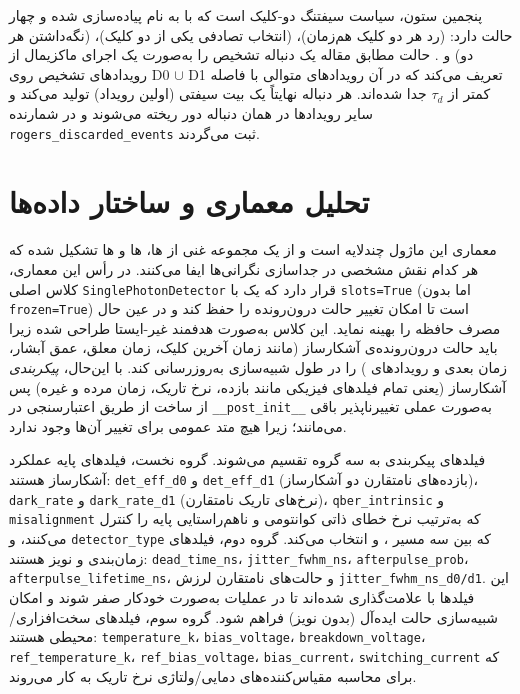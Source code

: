 پنجمین ستون، سیاست سيفتنگ دو-کلیک  است که با  به نام  پیاده‌سازی شده و چهار حالت دارد:  (رد هر دو کلیک هم‌زمان)،  (انتخاب تصادفی یکی از دو کلیک)،  (نگه‌داشتن هر دو) و . حالت  مطابق مقاله  یک دنباله تشخیص  را به‌صورت یک اجرای ماکزیمال از رویدادهای تشخیص روی D0 $\cup$ D1 تعریف می‌کند که در آن رویدادهای متوالی با فاصله کمتر از $\tau_d$ جدا شده‌اند. هر دنباله نهایتاً یک بیت سیفتی  (اولین رویداد) تولید می‌کند و سایر رویدادها در همان دنباله دور ریخته می‌شوند و در شمارنده \texttt{rogers\_discarded\_events} ثبت می‌گردند.

\section{تحلیل معماری و ساختار داده‌ها}

معماری این ماژول چندلایه است و از یک مجموعه غنی از ها، ها و ها تشکیل شده که هر کدام نقش مشخصی در جداسازی نگرانی‌ها  ایفا می‌کنند. در رأس این معماری، کلاس اصلی \texttt{SinglePhotonDetector} قرار دارد که یک  با \texttt{slots=True} (اما بدون \texttt{frozen=True}) است تا امکان تغییر حالت درون‌رونده  را حفظ کند و در عین حال مصرف حافظه را بهینه نماید. این کلاس به‌صورت هدفمند غیر-ایستا  طراحی شده زیرا باید حالت درون‌رونده‌ی آشکارساز (مانند زمان آخرین کلیک، زمان  معلق، عمق آبشار، زمان  بعدی و رویدادهای ) را در طول شبیه‌سازی به‌روزرسانی کند. با این‌حال، \textit{پیکربندی} آشکارساز (یعنی تمام فیلدهای فیزیکی مانند بازده، نرخ تاریک، زمان مرده و غیره) پس از ساخت از طریق اعتبارسنجی در \texttt{\_\_post\_init\_\_} به‌صورت عملی تغییرناپذیر باقی می‌مانند؛ زیرا هیچ متد عمومی برای تغییر آن‌ها وجود ندارد.

فیلدهای پیکربندی به سه گروه تقسیم می‌شوند. گروه نخست، فیلدهای پایه عملکرد آشکارساز هستند: \texttt{det\_eff\_d0} و \texttt{det\_eff\_d1} (بازده‌های نامتقارن دو آشکارساز)، \texttt{dark\_rate} و \texttt{dark\_rate\_d1} (نرخ‌های تاریک نامتقارن)، \texttt{qber\_intrinsic} و \texttt{misalignment} که به‌ترتیب نرخ خطای ذاتی کوانتومی و ناهم‌راستایی پایه را کنترل می‌کنند، و \texttt{detector\_type} که بین سه مسیر ،  و  انتخاب می‌کند. گروه دوم، فیلدهای زمان‌بندی و نویز هستند: \texttt{dead\_time\_ns}، \texttt{jitter\_fwhm\_ns}، \texttt{afterpulse\_prob}، \texttt{afterpulse\_lifetime\_ns}، و حالت‌های نامتقارن لرزش \texttt{jitter\_fwhm\_ns\_d0/d1}. این فیلدها با  علامت‌گذاری شده‌اند تا در عملیات  به‌صورت خودکار صفر شوند و امکان شبیه‌سازی حالت ایده‌آل (بدون نویز) فراهم شود. گروه سوم، فیلدهای سخت‌افزاری/محیطی هستند: \texttt{temperature\_k}، \texttt{bias\_voltage}، \texttt{breakdown\_voltage}، \texttt{ref\_temperature\_k}، \texttt{ref\_bias\_voltage}، \texttt{bias\_current}، \texttt{switching\_current} که برای محاسبه مقیاس‌کننده‌های دمایی/ولتاژی نرخ تاریک به کار می‌روند.

